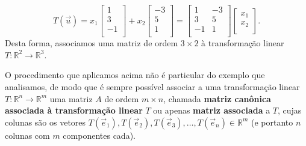 \documentclass[../livro.tex]{subfiles}
\begin{document}
\begin{equation}
T( \vec{u} ) =
x_1 \left[
  \begin{array}{r}
    1 \\
    3 \\
    -1 \\
  \end{array}
\right] + x_2
\left[
  \begin{array}{r}
    -3 \\
     5 \\
     1 \\
  \end{array}
\right] =
\left[
  \begin{array}{rr}
    1  & -3 \\
    3  & 5  \\
    -1 & 1 \\
  \end{array}
\right]
\left[
  \begin{array}{r}
    x_1 \\
    x_2 \\
  \end{array}
\right].
\end{equation} Desta forma, associamos uma matriz de ordem $3 \times 2$ à transformação linear $T: \mathbb{R}^2 \to \mathbb{R}^3$.

O procedimento que aplicamos acima não é particular do exemplo que analisamos, de modo que é sempre possível associar a uma transformação linear $T: \mathbb{R}^n \to \mathbb{R}^m$ uma matriz $A$ de ordem $m\times n$, chamada \textbf{matriz canônica associada à transformação linear} $T$ ou apenas \textbf{matriz associada} a $T$, cujas colunas são os vetores $T(\vec{e}_1), T(\vec{e}_2), T(\vec{e}_3), \dots, T(\vec{e}_n) \in \mathbb{R}^m$ (e portanto $n$ colunas com $m$ componentes cada).
\end{document}
